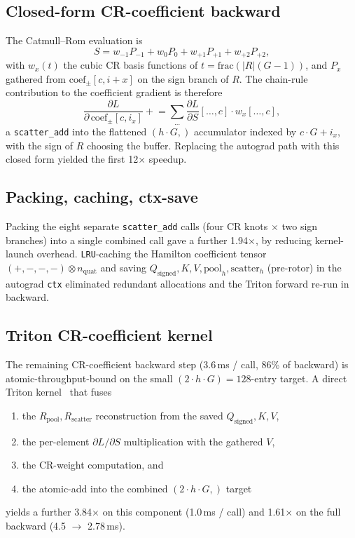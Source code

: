 \documentclass[11pt, a4paper]{article}
\begin{document}
\subsection{Closed-form CR-coefficient backward}

The Catmull--Rom evaluation is
\begin{equation}
S = w_{-1} P_{-1} + w_0 P_0 + w_{+1} P_{+1} + w_{+2} P_{+2},
\end{equation}
with $w_x(t)$ the cubic CR basis functions of
$t = \mathrm{frac}(|R|(G-1))$, and $P_x$ gathered from
$\mathrm{coef}_{\pm}[c, i + x]$ on the sign branch of $R$. The
chain-rule contribution to the coefficient gradient is therefore
\begin{equation}
\frac{\partial L}{\partial\,\mathrm{coef}_{\pm}[c, i_x]}
  \mathrel{+}= \sum_{\ldots} \frac{\partial L}{\partial S}[\ldots, c]
                   \cdot w_x[\ldots, c],
\end{equation}
a \texttt{scatter\_add} into the flattened $(h \cdot G,)$ accumulator
indexed by $c \cdot G + i_x$, with the sign of $R$ choosing the buffer.
Replacing the autograd path with this closed form yielded the first
12$\times$ speedup.

\subsection{Packing, caching, ctx-save}

Packing the eight separate \texttt{scatter\_add} calls
(four CR knots $\times$ two sign branches) into a single combined call
gave a further 1.94$\times$, by reducing kernel-launch overhead.
\texttt{LRU}-caching the Hamilton coefficient tensor
$(+, -, -, -) \otimes n_{\text{quat}}$ and saving $Q_{\text{signed}},
K, V, \mathrm{pool}_h, \mathrm{scatter}_h$ (pre-rotor) in the autograd
\texttt{ctx} eliminated redundant allocations and the Triton forward
re-run in backward.

\subsection{Triton CR-coefficient kernel}

The remaining CR-coefficient backward step (3.6\,ms / call, 86\% of
backward) is atomic-throughput-bound on the small
$(2 \cdot h \cdot G) = 128$-entry target. A direct Triton
kernel~\cite{tillet2019triton} that fuses
\begin{enumerate}
\item the $R_{\text{pool}}, R_{\text{scatter}}$ reconstruction from
      the saved $Q_{\text{signed}}, K, V$,
\item the per-element $\partial L / \partial S$ multiplication with the
      gathered $V$,
\item the CR-weight computation, and
\item the atomic-add into the combined $(2 \cdot h \cdot G,)$ target
\end{enumerate}
yields a further 3.84$\times$ on this component (1.0\,ms / call) and
1.61$\times$ on the full backward (4.5 $\to$ 2.78\,ms).
\end{document}
